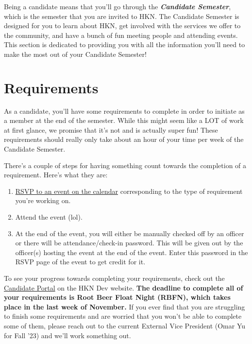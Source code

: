 \documentclass[11pt, article, oneside]{memoir}
\begin{document}
        \bigbreak

        Being a candidate means that you'll go through the \textbf{\emph{Candidate Semester}}, which is the semester that you are invited to HKN. The Candidate Semester is designed for you to learn about HKN, get involved with the services we offer to the community, and have a bunch of fun meeting people and attending events. This section is dedicated to providing you with all the information you'll need to make the most out of your Candidate Semester!


    \section{Requirements}
        As a candidate, you'll have some requirements to complete in order to initiate as a member at the end of the semester. While this might seem like a LOT of work at first glance, we promise that it's not and is actually super fun! These requirements should really only take about an hour of your time per week of the Candidate Semester.
        
        \bigbreak

        There's a couple of steps for having something count towards the completion of a requirement. Here's what they are:
        \begin{enumerate}
            \item \href{https://dev-hkn.eecs.berkeley.edu/events/}{RSVP to an event on the calendar} corresponding to the type of requirement you're working on.
            \item Attend the event (lol).
            \item At the end of the event, you will either be manually checked off by an officer or there will be attendance/check-in password. This will be given out by the officer(s) hosting the event at the end of the event. Enter this password in the RSVP page of the event to get credit for it.
        \end{enumerate}

        To see your progress towards completing your requirements, check out the \href{https://dev-hkn.eecs.berkeley.edu/cand/}{Candidate Portal} on the HKN Dev website. \textbf{The deadline to complete all of your requirements is Root Beer Float Night (RBFN), which takes place in the last week of November.} If you ever find that you are struggling to finish some requirements and are worried that you won't be able to complete some of them, please reach out to the current External Vice President (Omar Yu for Fall '23) and we'll work something out.
\end{document}
